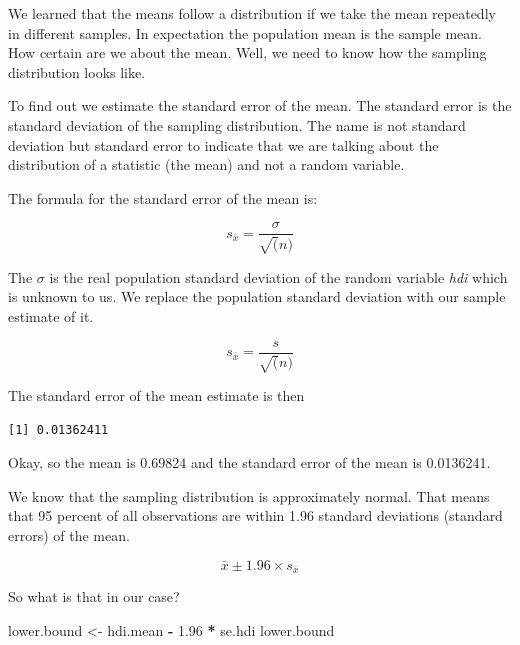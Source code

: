 \documentclass[]{article}
\newenvironment{Shaded}{\begin{snugshade}}{\end{snugshade}}
\newcommand{\KeywordTok}[1]{\textcolor[rgb]{0.13,0.29,0.53}{\textbf{#1}}}
\newcommand{\FloatTok}[1]{\textcolor[rgb]{0.00,0.00,0.81}{#1}}
\newcommand{\StringTok}[1]{\textcolor[rgb]{0.31,0.60,0.02}{#1}}
\newcommand{\OperatorTok}[1]{\textcolor[rgb]{0.81,0.36,0.00}{\textbf{#1}}}
\newcommand{\NormalTok}[1]{#1}
\theoremstyle{definition}
\theoremstyle{definition}
\theoremstyle{definition}
\theoremstyle{remark}
\begin{document}
We learned that the means follow a distribution if we take the mean
repeatedly in different samples. In expectation the population mean is
the sample mean. How certain are we about the mean. Well, we need to
know how the sampling distribution looks like.

To find out we estimate the standard error of the mean. The standard
error is the standard deviation of the sampling distribution. The name
is not standard deviation but standard error to indicate that we are
talking about the distribution of a statistic (the mean) and not a
random variable.

The formula for the standard error of the mean is:

\[ s_{\bar{x}} = \frac{ \sigma }{ \sqrt(n) }  \]

The \(\sigma\) is the real population standard deviation of the random
variable \emph{hdi} which is unknown to us. We replace the population
standard deviation with our sample estimate of it.

\[ s_{\bar{x}} = \frac{ s }{ \sqrt(n) }  \]

The standard error of the mean estimate is then

\begin{Shaded}
\end{Shaded}

\begin{verbatim}
[1] 0.01362411
\end{verbatim}

Okay, so the mean is 0.69824 and the standard error of the mean is
0.0136241.

We know that the sampling distribution is approximately normal. That
means that 95 percent of all observations are within 1.96 standard
deviations (standard errors) of the mean.

\[ \bar{x} \pm 1.96 \times s_{\bar{x}} \]

So what is that in our case?

\begin{Shaded}
\begin{Highlighting}[]
\NormalTok{lower.bound <-}\StringTok{ }\NormalTok{hdi.mean }\OperatorTok{-}\StringTok{ }\FloatTok{1.96} \OperatorTok{*}\StringTok{ }\NormalTok{se.hdi}
\NormalTok{lower.bound}
\end{Highlighting}
\end{Shaded}
\end{document}
